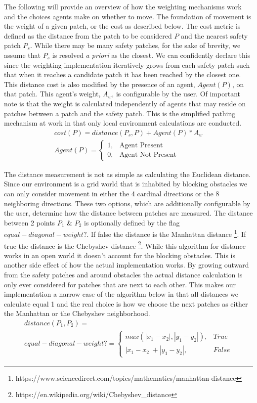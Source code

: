 \documentclass[12pt,letterpaper]{article}
\begin{document}
The following will provide an overview of how the weighting mechanisms work and the choices agents make on whether to move.  The foundation of movement is the weight of a given patch, or the cost as described below. The cost metric is defined as the distance from the patch to be considered $P$ and the nearest safety patch $P_s$.  While there may be many safety patches, for the sake of brevity, we assume that $P_s$ is resolved \emph{a priori} as the closest.  We can confidently declare this since the weighting implementation iteratively grows from each safety patch such that when it reaches a candidate patch it has been reached by the closest one.  This distance cost is also modified by the presence of an agent, $Agent(P)$, on that patch.  This agent's weight, $A_w$, is configurable by the user.  Of important note is that the weight is calculated independently of agents that may reside on patches between a patch and the safety patch.  This is the simplified pathing mechanism at work in that only local environment calculations are conducted.
\begin{align}
cost(P)  = distance(P_s, P) + Agent(P) * A_w \nonumber \\
Agent(P)=
\begin{cases}
1, & \text{Agent Present}  \\
0, & \text{Agent Not Present} 
\end{cases}
\end{align}

The distance measurement is not as simple as calculating the Euclidean distance.  Since our environment is a grid world that is inhabited by blocking obstacles we can only consider movement in either the 4 cardinal directions or the 8 neighboring directions.  These two options, which are additionally configurable by the user, determine how the distance between patches are measured.  The distance between 2 points $P_1$ \& $P_2$ is optionally defined by the flag $equal-diagonal-weight?$.  If false the distance is the Manhattan distance \footnote{ https://www.sciencedirect.com/topics/mathematics/manhattan-distance}. If true the distance is the Chebyshev distance \footnote{https://en.wikipedia.org/wiki/Chebyshev\_distance}. While this algorithm for distance works in an open world it doesn't account for the blocking obstacles.  This is another side effect of how the actual implementation works.  By growing outward from the safety patches and around obstacles the actual distance calculation is only ever considered for patches that are next to each other.  This makes our implementation a narrow case of the algorithm below in that all distances we calculate equal 1 and the real choice is how we choose the next patches as either the Manhattan or the Chebyshev neighborhood.
\begin{align}
distance(P_1, P_2)  = \nonumber\\
equal-diagonal-weight?=
\begin{cases}
	max(|x_1-x_2|, |y_1-y_2|), & True \\
	|x_1-x_2|+ |y_1-y_2|, & False
\end{cases}
\label{cost}
\end{align}
\end{document}
